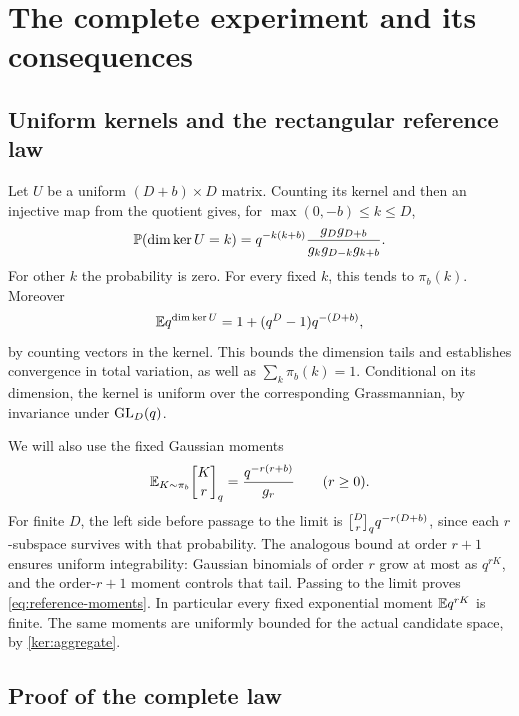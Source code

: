 \section{The complete experiment and its consequences}
\label{sec:critical-law}

\subsection{Uniform kernels and the rectangular reference law}

Let $U$ be a uniform $(D+b)\times D$ matrix. Counting its kernel and then
an injective map from the quotient gives, for
$\max(0,-b)\le k\le D$,
\begin{equation}
 \mathbb P(\dim\ker U=k)
 =q^{-k(k+b)}\frac{g_D g_{D+b}}{g_k g_{D-k}g_{k+b}}.
 \label{eq:finite-nullity}
\end{equation}
For other $k$ the probability is zero. For every fixed $k$, this tends to
$\pi_b(k)$. Moreover
\[
 \mathbb E q^{\dim\ker U}=1+(q^D-1)q^{-(D+b)},
\]
by counting vectors in the kernel. This bounds the dimension tails and
establishes convergence in total variation, as well as
$\sum_k\pi_b(k)=1$. Conditional on its dimension, the kernel is uniform
over the corresponding Grassmannian, by invariance under $\operatorname{GL}_D(q)$.

We will also use the fixed Gaussian moments
\begin{equation}
 \E_{K\sim\pi_b}\qbinom K r
 =\frac{q^{-r(r+b)}}{g_r}\qquad(r\ge0).
 \label{eq:reference-moments}
\end{equation}
For finite $D$, the left side before passage to the limit is
$\qbinom D r q^{-r(D+b)}$, since each $r$-subspace survives with that
probability. The analogous bound at order $r+1$ ensures uniform
integrability: Gaussian binomials of order $r$ grow at most as $q^{rK}$,
and the order-$r+1$ moment controls that tail. Passing to the limit proves
\eqref{eq:reference-moments}. In particular every fixed exponential
moment $\mathbb E q^{rK}$ is finite. The same moments are uniformly bounded for
the actual candidate space, by \cref{ker:aggregate}.

\subsection{Proof of the complete law}

